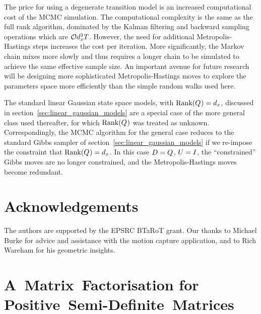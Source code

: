 \documentclass[journal,10pt]{IEEEtran}
\begin{document}
The price for using a degenerate transition model is an increased computational cost of the MCMC simulation. The computational complexity is the same as the full rank algorithm, dominated by the Kalman filtering and backward sampling operations which are $\mathcal{O}{d_x^3 T}$. However, the need for additional Metropolis-Hastings steps increases the cost per iteration. More significantly, the Markov chain mixes more slowly and thus requires a longer chain to be simulated to achieve the same effective sample size. An important avenue for future research will be designing more sophisticated Metropolis-Hastings moves to explore the parameters space more efficiently than the simple random walks used here.

The standard linear Gaussian state space models, with $\operatorname{Rank}(Q_{})=d_x$, discussed in section~\ref{sec:linear_gaussian_models} are a special case of the more general class used thereafter, for which $\operatorname{Rank}(Q_{})$ was treated as unknown. Correspondingly, the MCMC algorithm for the general case reduces to the standard Gibbs sampler of section~\ref{sec:linear_gaussian_models} if we re-impose the constraint that $\operatorname{Rank}(Q_{})=d_x$. In this case $D=Q_{}$, $U=I_{}$, the ``constrained'' Gibbs moves are no longer constrained, and the Metropolis-Hastings moves become redundant.



\section*{Acknowledgements}
The authors are supported by the EPSRC BTaRoT grant. Our thanks to Michael Burke for advice and assistance with the motion capture application, and to Rich Wareham for his geometric insights.


\appendices

\section{A~Matrix~Factorisation for Positive~Semi-Definite~Matrices} \label{app:givens-factorisation}
\end{document}
